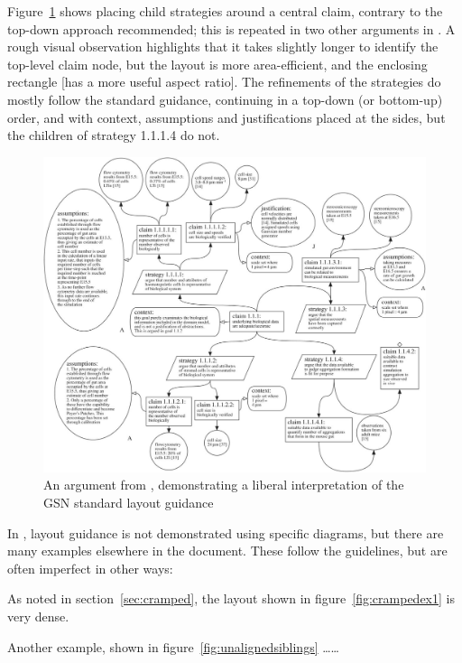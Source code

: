 Figure~\ref{fig:aldencentral} shows \citet{royal} placing child strategies around a central claim, contrary to the top-down approach recommended; this is repeated in two other arguments in \cite[pp.~8--9]{royal} .
A rough visual observation highlights that it takes slightly longer to identify the top-level claim node, but the layout is more area-efficient, and the enclosing rectangle  [has a more useful aspect ratio].
The refinements of the strategies do mostly follow the standard guidance, continuing in a top-down (or bottom-up) order, and with context, assumptions and justifications placed at the sides, but the children of strategy 1.1.1.4 do not.

\begin{figure}
    \includegraphics[width=\textwidth]{graphics/aldencentral.jpg}
    \caption{An argument from \cite{royal}, demonstrating a liberal interpretation of the GSN standard layout guidance}
    \label{fig:aldencentral}
\end{figure}

In \cite{gsnstandard}, layout guidance is not demonstrated using specific diagrams, but there are many examples elsewhere in the document. These follow the guidelines, but are often imperfect in other ways:

\begin{itemize*}
    \item As noted in section~\ref{sec:cramped}, the layout shown in figure~\ref{fig:crampedex1} is very dense.
    \item Another example, shown in figure~\ref{fig:unalignedsiblings} \ldots \ldots
\end{itemize*}

